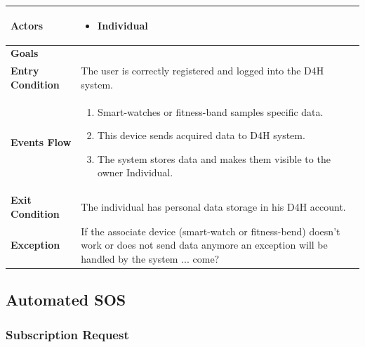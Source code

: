             \begin{table}[H]
            	\centering
                
                \begin{tabular}{|p{3cm}|p{8.2cm}|}
                    \hline
                    \textbf{Actors} & \begin{itemize}
                        \item Individual
                    \end{itemize} \\
                     \hline
                    \textbf{Goals} & \\ 
                     \hline
                    \textbf{Entry Condition} & The user is correctly registered and logged into the D4H system.\\
                     \hline
                    \textbf{Events Flow} & \begin{enumerate}
                                                \item Smart-watches or fitness-band samples specific data.
                                                \item This device sends acquired data to D4H system.
                                                \item The system stores data and makes them visible to the owner Individual.
                                            \end{enumerate}\\
                     \hline
                    \textbf{Exit Condition} & The individual has personal data storage in his D4H account.\\
                     \hline
                    \textbf{Exception} & If the associate device (smart-watch or fitness-bend) doesn't work or does not send data anymore an exception will be handled by the system ... come?\\
                     \hline
                \end{tabular}  
            \end{table} 
            
    \subsection{Automated SOS}
            
        \subsubsection{Subscription Request}
            
